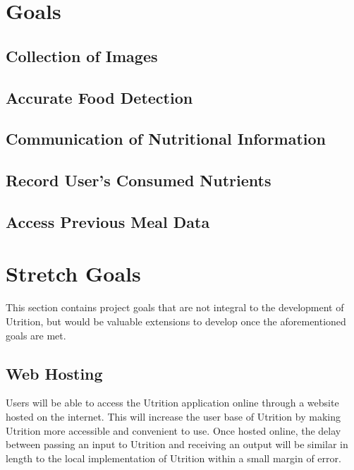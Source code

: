 \documentclass{article}
\begin{document}

\section{Goals}

\subsection{Collection of Images}

\subsection{Accurate Food Detection}

\subsection{Communication of Nutritional Information}

\subsection{Record User's Consumed Nutrients}

\subsection{Access Previous Meal Data}

\section{Stretch Goals}

This section contains project goals that are not integral to the development of Utrition, but would be valuable extensions to develop once the aforementioned goals are met.

\subsection{Web Hosting}

Users will be able to access the Utrition application online through a website hosted on the internet. This will increase the user base of Utrition by making Utrition more accessible and convenient to use. Once hosted online, the delay between passing an input to Utrition and receiving an output will be similar in length to the local implementation of Utrition within a small margin of error.
\end{document}
